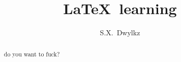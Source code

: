 \documentclass[10pt,a4paper,titlepage]{article}
\begin{document}
\title{\LaTeX\ learning}

\author{S.X.~Dwylkz}
\maketitle

\tableofcontents

\begin{abstract}
	do you want to fuck?
\end{abstract}
\end{document}
